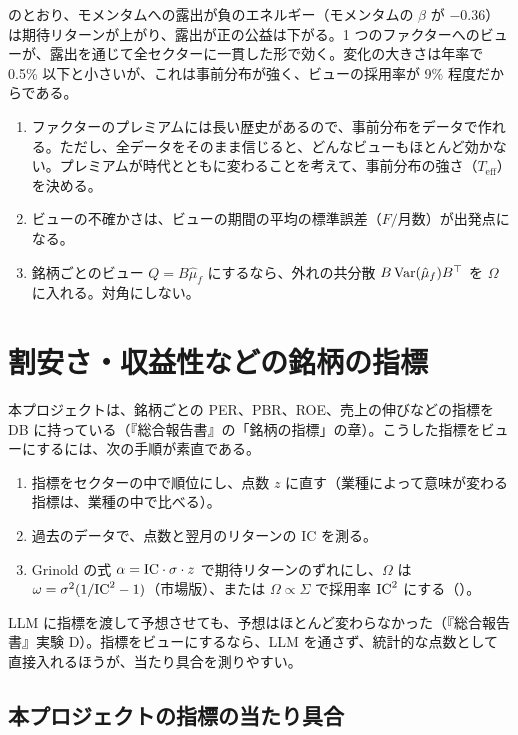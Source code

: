  のとおり、モメンタムへの露出が負のエネルギー（モメンタムの $\beta$ が $-0.36$）は期待リターンが上がり、露出が正の公益は下がる。1 つのファクターへのビューが、露出を通じて全セクターに一貫した形で効く。変化の大きさは年率で 0.5\% 以下と小さいが、これは事前分布が強く、ビューの採用率が 9\% 程度だからである。

\begin{tipbox}[コツ：ファクターへのビュー]
\begin{enumerate}
\item ファクターのプレミアムには長い歴史があるので、事前分布をデータで作れる。ただし、全データをそのまま信じると、どんなビューもほとんど効かない。プレミアムが時代とともに変わることを考えて、事前分布の強さ（$T_{\mathrm{eff}}$）を決める。
\item ビューの不確かさは、ビューの期間の平均の標準誤差（$F/\text{月数}$）が出発点になる。
\item 銘柄ごとのビュー $Q=B\hat\mu_f$ にするなら、外れの共分散 $B\,\mathrm{Var}(\hat\mu_f)B^{\top}$ を $\Omega$ に入れる。対角にしない。
\end{enumerate}
\end{tipbox}

\section{割安さ・収益性などの銘柄の指標}

本プロジェクトは、銘柄ごとの PER、PBR、ROE、売上の伸びなどの指標を DB に持っている（『総合報告書』の「銘柄の指標」の章）。こうした指標をビューにするには、次の手順が素直である。

\begin{enumerate}
\item 指標をセクターの中で順位にし、点数 $z$ に直す（業種によって意味が変わる指標は、業種の中で比べる）。
\item 過去のデータで、点数と翌月のリターンの IC を測る。
\item Grinold の式 $\alpha=\mathrm{IC}\cdot\sigma\cdot z$ で期待リターンのずれにし、$\Omega$ は $\omega=\sigma^2(1/\mathrm{IC}^2-1)$（市場版）、または $\Omega\propto\Sigma$ で採用率 $\mathrm{IC}^2$ にする（）。
\end{enumerate}

LLM に指標を渡して予想させても、予想はほとんど変わらなかった（『総合報告書』実験 D）。指標をビューにするなら、LLM を通さず、統計的な点数として直接入れるほうが、当たり具合を測りやすい。

\subsection*{本プロジェクトの指標の当たり具合}

